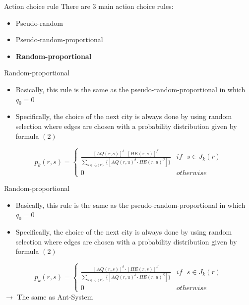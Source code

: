\documentclass[aspectratio=169,xcolor=dvipsnames]{beamer}
\begin{document}
\begin{frame}{Action choice rule}
    There are 3 main action choice rules:
    \begin{itemize}
        \item Pseudo-random
        \item Pseudo-random-proportional
        \item \textbf{Random-proportional}
    \end{itemize}
\end{frame}

\begin{frame}{Random-proportional}
    \begin{itemize}
        \item Basically, this rule is the same as the pseudo-random-proportional in which $q_0 = 0$
        \item Specifically, the choice of the next city is always done by using random selection where edges are chosen with a probability distribution given by formula $(2)$
    \end{itemize}
    \begin{equation*}
        p_k(r, s) = \begin{cases}\frac{\left[AQ\left(r, s\right)\right]^\delta \cdot\left[HE(r, s)\right]^\beta}{\sum_{u \in J_k(r)}\{\left[AQ\left(r, u\right)^\delta\cdot HE\left(r, u\right)^\beta\right]\}} &if \text{ }s\in J_k(r)\\0 &otherwise\end{cases}
    \end{equation*}
\end{frame}

\begin{frame}{Random-proportional}
    \begin{itemize}
        \item Basically, this rule is the same as the pseudo-random-proportional in which $q_0 = 0$
        \item Specifically, the choice of the next city is always done by using random selection where edges are chosen with a probability distribution given by formula $(2)$
    \end{itemize}
    \begin{equation*}
        p_k(r, s) = \begin{cases}\frac{\left[AQ\left(r, s\right)\right]^\delta \cdot\left[HE(r, s)\right]^\beta}{\sum_{u \in J_k(r)}\{\left[AQ\left(r, u\right)^\delta\cdot HE\left(r, u\right)^\beta\right]\}} &if \text{ }s\in J_k(r)\\0 &otherwise\end{cases}
    \end{equation*}
    $\rightarrow$ The same as Ant-System
\end{frame}
\end{document}
